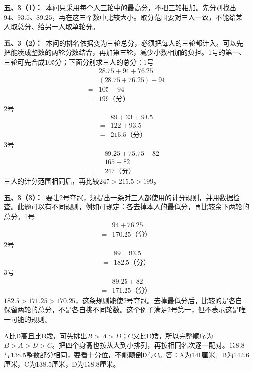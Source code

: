 \documentclass[multi=snippet,border=0pt]{standalone}
\newenvironment{snippet}[3]{\begin{minipage}{#1bp}\color{answerred}\fontsize{#2}{#3}\selectfont\raggedright}{\end{minipage}}
\begin{document}
\begin{snippet}{505}{11.5}{14}\textbf{五、3（1）：}\ 本问只采用每个人三轮中的最高分，不把三轮相加。先分别找出94、\(93.5\)、\(89.25\)，再在这三个数中比较大小。取分范围要对三人一致，不能给某人取总分、给另一人取单轮分。\end{snippet}
\begin{snippet}{505}{11.5}{14}\textbf{五、3（2）：}\ 本问的排名依据变为三轮总分，必须把每人的三轮都计入。可以先把能凑成整数的两轮分数结合，再加第三轮，减少小数相加的负担。1号的第一、三轮可先合成105分；下面分别求三人的总分：1号\[\begin{aligned}&28.75+94+76.25\\={}&(28.75+76.25)+94\\={}&105+94\\={}&199\text{（分）}\end{aligned}\]2号\[\begin{aligned}&89+33+93.5\\={}&122+93.5\\={}&215.5\text{（分）}\end{aligned}\]3号\[\begin{aligned}&89.25+75.75+82\\={}&165+82\\={}&247\text{（分）}\end{aligned}\]三人的计分范围相同后，再比较\(247>215.5>199\)。\end{snippet}
\begin{snippet}{505}{11.5}{14}\textbf{五、3（3）：}\ 要让2号夺冠，须提出一条对三人都使用的计分规则，并用数据检查。此题可以有不同规则，例如可规定：各去掉本人的最低分，再比较余下两轮的总分。1号\[\begin{aligned}&94+76.25\\={}&170.25\text{（分）}\end{aligned}\]2号\[\begin{aligned}&89+93.5\\={}&182.5\text{（分）}\end{aligned}\]3号\[\begin{aligned}&89.25+82\\={}&171.25\text{（分）}\end{aligned}\]\(182.5>171.25>170.25\)，这条规则能使2号夺冠。去掉最低分后，比较的是各自保留两轮的总分，不是各自挑不同轮数。这个例子满足2号第一，但不表示这是唯一可能的规则。\end{snippet}
\begin{snippet}{505}{11.5}{14}A比D高且比B矮，可先排出\(B>A>D\)；C又比D矮，所以完整顺序为\(B>A>D>C\)。把四个身高也按从大到小排列，再按相同名次逐一配对。\(138.8\)与\(138.5\)整数部分相同，要看十分位，不能颠倒D与C。答：A为141厘米，B为142.6厘米，C为138.5厘米，D为138.8厘米。\end{snippet}
\end{document}
